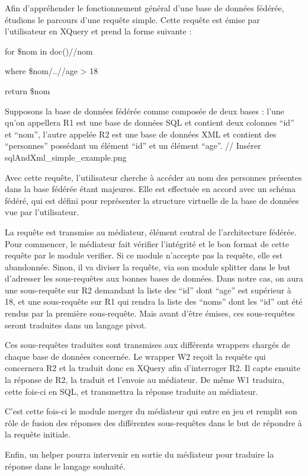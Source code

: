 Afin d’appréhender le fonctionnement général d’une base de données fédérée, étudions le parcours d’une requête simple. Cette requête est émise par l’utilisateur en XQuery et prend la forme suivante :

for \$nom in doc()//nom

where \$nom/..//age > 18

return \$nom

Supposons la base de données fédérée comme composée de deux bases : l’une qu’on appellera R1 est une base de données SQL et contient deux colonnes “id” et “nom”, l’autre appelée R2 est une base de données XML et contient des “personnes” possédant un élément “id” et un élément “age”. // Insérer sqlAndXml\_simple\_example.png


Avec cette requête, l’utilisateur cherche à accéder au nom des personnes présentes dans la base fédérée étant majeures. Elle est effectuée en accord avec un schéma fédéré, qui est défini pour représenter la structure virtuelle de la base de données vue par l’utilisateur.

La requête est transmise au médiateur, élément central de l’architecture fédérée. Pour commencer, le médiateur fait vérifier l’intégrité et le bon format de cette requête par le module verifier. Si ce module n’accepte pas la requête, elle est abandonnée. Sinon, il va diviser la requête, via son module splitter dans le but d’adresser les sous-requêtes aux bonnes bases de données. Dans notre cas, on aura une sous-requête sur R2 demandant la liste des “id” dont “age” est supérieur à 18, et une sous-requête sur R1 qui rendra la liste des “noms” dont les “id” ont été rendus par la première sous-requête. Mais avant d’être émises, ces sous-requêtes seront traduites dans un langage pivot.

Ces sous-requêtes traduites sont transmises aux différents wrappers chargés de chaque base de données concernée. Le wrapper W2 reçoit la requête qui concernera R2 et la traduit donc en XQuery afin d’interroger R2. Il capte ensuite la réponse de R2, la traduit et l’envoie au médiateur. De même W1 traduira, cette fois-ci en SQL, et transmettra la réponse traduite au médiateur.

C’est cette fois-ci le module merger du médiateur qui entre en jeu et remplit son rôle de fusion des réponses des différentes sous-requêtes dans le but de répondre à la requête initiale.

Enfin, un helper pourra intervenir en sortie du médiateur pour traduire la réponse dans le langage souhaité.

